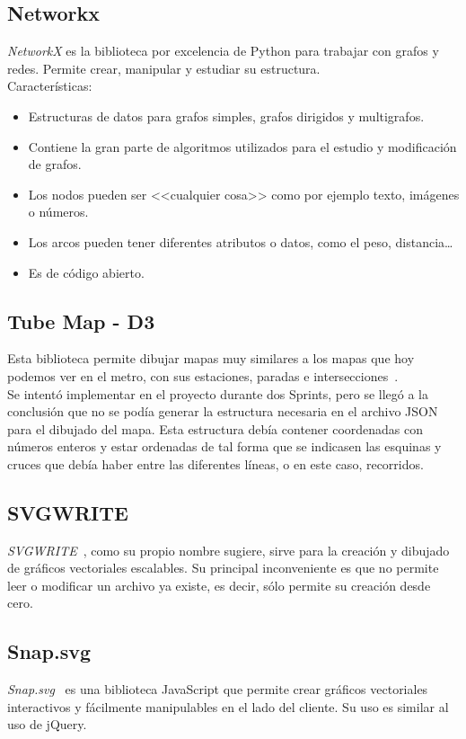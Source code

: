 \subsection{Networkx}
\textit{NetworkX} es la biblioteca por excelencia de Python para trabajar con grafos y redes. Permite crear, manipular y estudiar su estructura.
\\
Características:
\begin{itemize}
	\item Estructuras de datos para grafos simples, grafos dirigidos y multigrafos.
	\item Contiene la gran parte de algoritmos utilizados para el estudio y modificación de grafos.
	\item Los nodos pueden ser <<cualquier cosa>> como por ejemplo texto, imágenes o números.
	\item Los arcos pueden tener diferentes atributos o datos, como el peso, distancia\dots
	\item Es de código abierto.
\end{itemize}


\subsection{Tube Map - D3}
Esta biblioteca permite dibujar mapas muy similares a los mapas que hoy podemos ver en el metro, con sus estaciones, paradas e intersecciones~\cite{doc:tubemap}.
\\
Se intentó implementar en el proyecto durante dos Sprints, pero se llegó a la conclusión que no se podía generar la estructura necesaria en el archivo JSON para el dibujado del mapa. Esta estructura debía contener coordenadas con números enteros y estar ordenadas de tal forma que se indicasen las esquinas y cruces que debía haber entre las diferentes líneas, o en este caso, recorridos.

\subsection{SVGWRITE}
\textit{SVGWRITE}~\cite{doc:svgwritedocs}, como su propio nombre sugiere, sirve para la creación y dibujado de gráficos vectoriales escalables. Su principal inconveniente es que no permite leer o modificar un archivo ya existe, es decir, sólo permite su creación desde cero.

\subsection{Snap.svg}
\textit{Snap.svg}~\cite{doc:snapsvg} es una biblioteca JavaScript que permite crear gráficos vectoriales interactivos y fácilmente manipulables en el lado del cliente. Su uso es similar al uso de jQuery.


